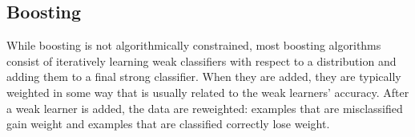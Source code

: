 \subsection{Boosting}
While boosting is not algorithmically constrained, most boosting algorithms consist of iteratively learning weak classifiers with respect to a distribution and adding them to a final strong classifier. When they are added, they are typically weighted in some way that is usually related to the weak learners' accuracy. After a weak learner is added, the data are reweighted: examples that are misclassified gain weight and examples that are classified correctly lose weight. 











